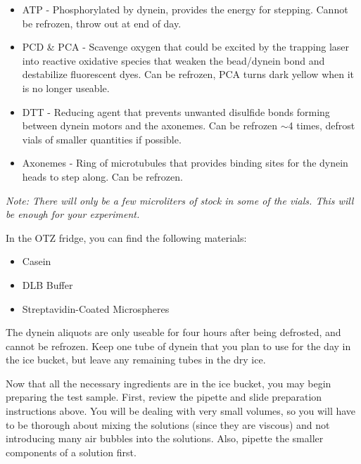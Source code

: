 \documentclass{../lab}
\begin{document}
\begin{itemize}
    \item ATP - Phosphorylated by dynein, provides the energy for stepping. Cannot be refrozen, throw out at end of day.

    \item PCD \& PCA - Scavenge oxygen that could be excited by the trapping laser into reactive oxidative species that weaken the bead/dynein bond and destabilize fluorescent dyes. Can be refrozen, PCA turns dark yellow when it is no longer useable.

    \item DTT - Reducing agent that prevents unwanted disulfide bonds forming between dynein motors and the axonemes. Can be refrozen $\sim$4 times, defrost vials of smaller quantities if possible.

    \item Axonemes - Ring of microtubules that provides binding sites for the dynein heads to step along. Can be refrozen.

\end{itemize}

\emph{Note: There will only be a few microliters of stock in some of the vials. This will be enough for your experiment.}

In the OTZ fridge, you can find the following materials:

\begin{itemize}
    \item Casein

    \item DLB Buffer

    \item Streptavidin-Coated Microspheres

\end{itemize}

The dynein aliquots are only useable for four hours after being defrosted, and cannot be refrozen. Keep one tube of dynein that you plan to use for the day in the ice bucket, but leave any remaining tubes in the dry ice.

Now that all the necessary ingredients are in the ice bucket, you may begin preparing the test sample. First, review the pipette and slide preparation instructions above. You will be dealing with very small volumes, so you will have to be thorough about mixing the solutions (since they are viscous) and not introducing many air bubbles into the solutions. Also, pipette the smaller components of a solution first.
\end{document}
